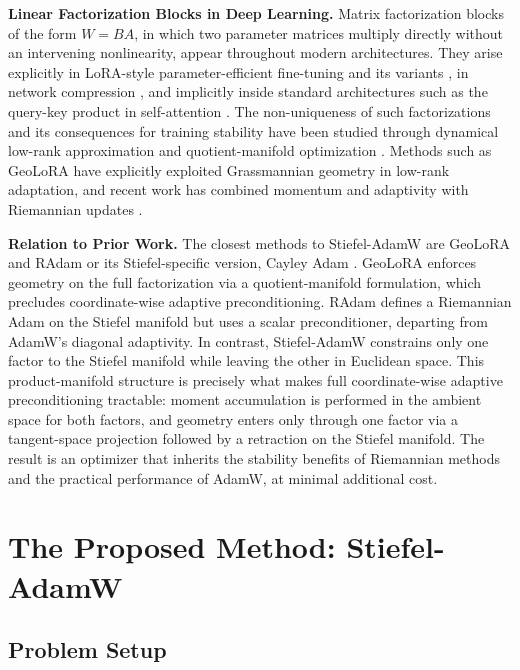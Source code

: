 \documentclass[11pt,a4paper]{article}
\numberwithin{equation}{section}
\newcommand{\algname}{Stiefel-AdamW}
\theoremstyle{plain}
\theoremstyle{definition}
\theoremstyle{remark}
\begin{document}
\textbf{Linear Factorization Blocks in Deep Learning.}
Matrix factorization blocks of the form $W = BA$, in which two parameter matrices multiply directly without an intervening nonlinearity, appear throughout modern architectures. They arise explicitly in LoRA-style parameter-efficient fine-tuning \cite{hu2022lora} and its variants \cite{Hayou2024loraplus,ZhangPilanci2024,zhu2024imbalanceregularized,Wang2025lorapro,schotthofer2025geolora}, in network compression \cite{Vogels:2019,saha2023matrix,Schotthoefer2022lottery}, and implicitly inside standard architectures such as the query-key product in self-attention \cite{NIPS2017_3f5ee243}. The non-uniqueness of such factorizations and its consequences for training stability have been studied through dynamical low-rank approximation \cite{KochLubich:2007,HnatiukKusch:2026,zangrando2024geometry} and quotient-manifold optimization \cite{Mishra2014}. Methods such as GeoLoRA \cite{schotthofer2025geolora} have explicitly exploited Grassmannian geometry in low-rank adaptation, and recent work has combined momentum and adaptivity with Riemannian updates \cite{schotthoefer2025,sakai2025a}.

\medskip

\textbf{Relation to Prior Work.} 
The closest methods to \algname{} are GeoLoRA \cite{schotthofer2025geolora} and RAdam \cite{BecigneulGanea:2019} or its Stiefel-specific version, Cayley Adam \cite{LFT:2020}. GeoLoRA enforces geometry on the full factorization via a quotient-manifold formulation, which precludes coordinate-wise adaptive preconditioning. RAdam defines a Riemannian Adam on the Stiefel manifold but uses a scalar preconditioner, departing from AdamW's diagonal adaptivity. In contrast, \algname{} constrains only one factor to the Stiefel manifold while leaving the other in Euclidean space. This product-manifold structure is precisely what makes full coordinate-wise adaptive preconditioning tractable: moment accumulation is performed in the ambient space for both factors, and geometry enters only through one factor via a tangent-space projection followed by a retraction on the Stiefel manifold. The result is an optimizer that inherits the stability benefits of Riemannian methods and the practical performance of AdamW, at minimal additional cost.


\section{The Proposed Method: \algname}
\subsection{Problem Setup}
\end{document}
